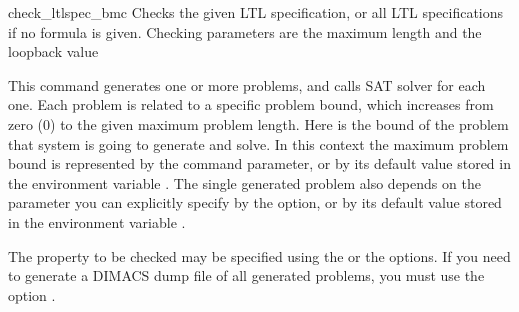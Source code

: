 \begin{nusmvCommand} {check\_ltlspec\_bmc} {\label{checkLtlspecBmcCoomand} 
Checks the given LTL specification, or all LTL specifications if no
formula is given.  Checking parameters are the maximum length and the
loopback value}


This command generates one or more problems, and calls SAT solver for
each one. Each problem is related to a specific problem bound, which
increases from zero ($0$) to the given maximum problem length. Here
 is the bound of the problem that system is going to
generate and solve.  In this context the maximum problem bound is
represented by the  command parameter, or by its default
value stored in the environment variable .  The
single generated problem also depends on the  parameter
you can explicitly specify by the  option, or by its
default value stored in the environment variable
.

The property to be checked may be specified using the  or the  options.  If you need to generate
a DIMACS dump file of all generated problems, you must use the option
.

\begin{cmdOpt}

       

            


\end{cmdOpt}
\end{nusmvCommand}
